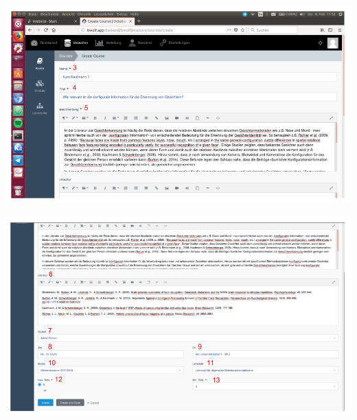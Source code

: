     \includegraphics[scale=0.3]{backend/img/create_course_1.png}

    \includegraphics[scale=0.3]{backend/img/create_course_2.png}
